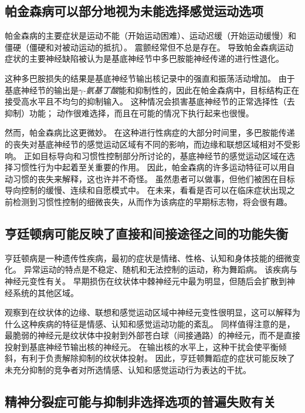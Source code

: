 \subsection{帕金森病可以部分地视为未能选择感觉运动选项}

帕金森病的主要症状是运动不能（开始运动困难）、运动迟缓（开始运动缓慢）和僵硬（僵硬和对被动运动的抵抗）。 震颤经常但不总是存在。
导致帕金森病运动症状的主要神经缺陷被认为是基底神经节中多巴胺能神经传递的进行性退化。


这种多巴胺损失的结果是基底神经节输出核记录中的强直和振荡活动增加。
由于基底神经节的输出是\textit{$\gamma$-氨基丁酸}能和抑制性的，因此在帕金森病中，目标结构正在接受高水平且不均匀的抑制输入。
这种情况会损害基底神经节的正常选择性（去抑制）功能； 动作很难选择，而且在可能的情况下执行起来也很慢。


然而，帕金森病比这更微妙。
在这种进行性病症的大部分时间里，多巴胺能传递的丧失对基底神经节的感觉运动区域有不同的影响，而边缘和联想区域相对不受影响。
正如目标导向和习惯性控制部分所讨论的，基底神经节的感觉运动区域在选择习惯性行为中起着至关重要的作用。
因此，帕金森病的许多运动特征可以用自动习惯的丧失来解释，这也许并不奇怪。
虽然患者可以做事，但他们被困在目标导向控制的缓慢、连续和自愿模式中。
在未来，看看是否可以在临床症状出现之前检测到习惯性控制的细微丧失，从而作为该病症的早期标志物，将会很有趣。



\subsection{亨廷顿病可能反映了直接和间接途径之间的功能失衡}

亨廷顿病是一种遗传性疾病，最初的症状是情绪、性格、认知和身体技能的细微变化。
异常运动的特点是不稳定、随机和无法控制的运动，称为舞蹈病。
该疾病与神经元变性有关。
早期损伤在纹状体中棘神经元中最为明显，但随后会扩散到神经系统的其他区域。


观察到在纹状体的边缘、联想和感觉运动区域中神经元变性很明显，这可以解释为什么这种疾病的特征是情感、认知和感觉运动功能的紊乱。
同样值得注意的是，最脆弱的神经元是纹状体中投射到外部苍白球（间接通路）的神经元，而不是直接投射到基底神经节输出核的神经元。
在输出核的水平上，这种干扰会使平衡倾斜，有利于负责解除抑制的纹状体投射。
因此，亨廷顿舞蹈症的症状可能反映了未充分抑制的竞争者对所选情感、认知和感觉运动行为表达的干扰。



\subsection{精神分裂症可能与抑制非选择选项的普遍失败有关}

